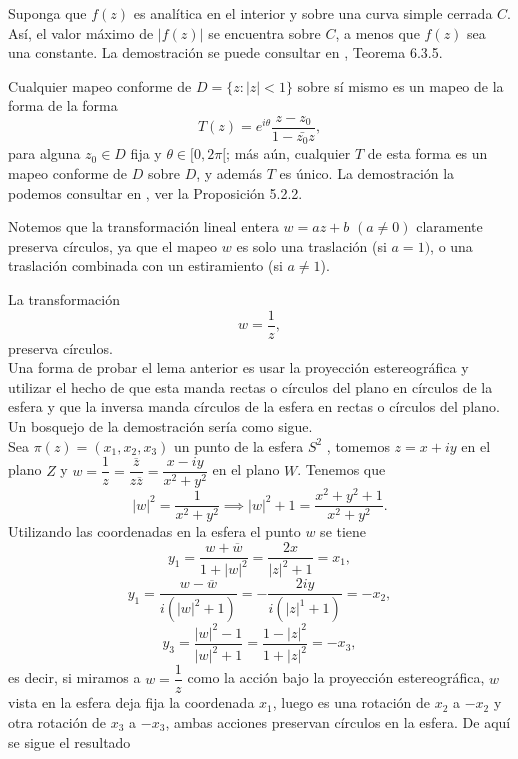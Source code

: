 \begin{teor}\label{modmx}
	Suponga que $f (z)$ es analítica en el interior y sobre una curva simple cerrada $C$. Así, el valor máximo de $| f (z)|$ se encuentra sobre $C$, a menos que $f (z)$ sea una constante.
	\proof La demostración se puede consultar en \cite{marsden}, Teorema 6.3.5.\endproof
\end{teor}
\begin{prop}
	Cualquier mapeo conforme de $D =\{ z : |z| < 1 \}$ sobre sí mismo es un mapeo de la forma de la forma
	$$T(z)=e^{i\theta}\dfrac{z-z_{0}}{1-\bar{z_{0}}z},$$
	para alguna $z_{0}\in D$ fija y $\theta \in [0, 2\pi[$; más aún, cualquier $T$ de esta forma es un mapeo conforme de $D$ sobre $D$, y además $T$ es único. 
	\proof
	La demostración la podemos consultar en \cite{marsden}, ver la Proposición  5.2.2. \endproof

\end{prop}
Notemos que la transformación lineal entera $w = az+b$ $(a\neq 0)$ claramente preserva círculos, ya que el mapeo $w$ es solo una traslación  (si $a = 1)$, o una traslación combinada con un estiramiento (si $a\neq 1$).
\begin{lema}\label{lema1}
	La transformación
	$$w=\dfrac{1}{z},$$
	preserva círculos.\\
Una forma de probar el lema anterior es usar la proyección estereográfica y utilizar el hecho de que esta manda rectas o círculos del plano en círculos de la esfera y
que la inversa manda círculos de la esfera en rectas o círculos del plano. Un bosquejo de la demostración sería como sigue.\\
Sea $\pi(z)=(x_1,x_2,x_3)$ un punto de la esfera $S^2$ , tomemos $z=x+iy$ en el plano $Z$ y $w=\dfrac{1}{z}=\dfrac{\overline{z}}{z\overline{z}}=\dfrac{x-iy}{x^2+y^2}$ en el plano $W$. Tenemos que 
$$|w|^2=\dfrac{1}{x^2+y^2}\implies |w|^2+1=\dfrac{x^2+y^2+1}{x^2+y^2}.$$
Utilizando las coordenadas en la esfera el punto $w$ se tiene 
$$y_1=\dfrac{w+\overline{w}}{1+|w|^2}=\dfrac{2x}{|z|^2+1}=x_1,$$
$$y_1=\dfrac{w-\overline{w}}{i(|w|^2+1)}=-\dfrac{2iy}{i(|z|^1+1)}=-x_2,$$
$$y_3=\dfrac{|w|^2-1}{|w|^2+1}=\dfrac{1-|z|^2}{1+|z|^2}=-x_3,$$
es decir, si miramos a $w=\dfrac{1}{z}$ como la acción bajo la proyección estereográfica, $w$ vista en la esfera deja fija la coordenada $x_1$, luego es una rotación de $x_2$ a $-x_2$ y otra rotación  de $x_3$ a $-x_3$, ambas acciones preservan círculos en la esfera. De aquí se sigue el resultado
\end{lema}

